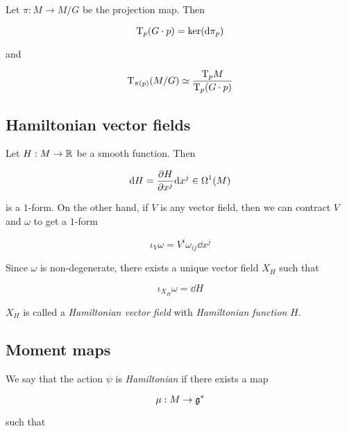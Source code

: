 \documentclass{article}
\begin{document}
\begin{proposition}
    Let \(\pi : M \to M/G\) be the projection map. Then

    \[\mathrm{T}_p(G\cdot p) = \ker(\dd\pi_p)\]

    and

    \[\mathrm{T}_{\pi(p)}(M/G) \simeq \frac{\mathrm{T}_pM}{\mathrm{T}_p(G\cdot p)}\]
\end{proposition}

\subsection{Hamiltonian vector fields}

Let \(H : M \to \mathbb{R}\) be a smooth function. Then

\[\dd H = \pdv{H}{x^j}\dd x^j \in \Omega^1(M)\]

is a \(1\)-form. On the other hand, if \(V\) is any vector field, then we can contract \(V\) and \(\omega\) to get a \(1\)-form

\[\iota_V \omega = V^i \omega_{ij}\dd x^j\]

Since \(\omega\) is non-degenerate, there exists a unique vector field \(X_H\) such that

\[\iota_{X_H}\omega = \dd H\]

\begin{definition}
     \(X_H\) is called a \emph{Hamiltonian vector field} with \emph{Hamiltonian function} \(H\).
\end{definition}

\subsection{Moment maps}

We say that the action \(\psi\) is \emph{Hamiltonian} if there exists a map

\[\mu : M \to \mathfrak{g}^*\]

such that
\end{document}

